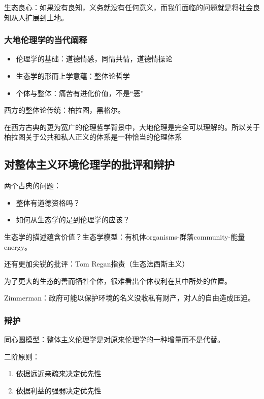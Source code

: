 \documentclass{ctexart}
\begin{document}
生态良心：如果没有良知，义务就没有任何意义，而我们面临的问题就是将社会良知从人扩展到土地。

\subsubsection{大地伦理学的当代阐释}

\begin{itemize}
    \item 伦理学的基础：道德情感，同情共情，道德情操论
    \item 生态学的形而上学意蕴：整体论哲学
    \item 个体与整体：痛苦有进化价值，不是“恶”
\end{itemize}

西方的整体论传统：柏拉图，黑格尔。

在西方古典的更为宽广的伦理哲学背景中，大地伦理是完全可以理解的。所以关于柏拉图关于公共和私人正义的体系是一种恰当的伦理体系

\subsection{对整体主义环境伦理学的批评和辩护}

两个古典的问题：

\begin{itemize}
    \item 整体有道德资格吗？
    \item 如何从生态学的是到伦理学的应该？
\end{itemize}

生态学的描述蕴含价值？生态学模型：有机体organisms-群落community-能量energy。

还有更加尖锐的批评：Tom Regan指责（生态法西斯主义）

为了更大的生态的善而牺牲个体，很难看出个体权利在其中所处的位置。

Zimmerman：政府可能以保护环境的名义没收私有财产，对人的自由造成压迫。

\subsubsection{辩护}

同心圆模型：整体主义伦理学是对原来伦理学的一种增量而不是代替。

二阶原则：

\begin{enumerate}
    \item 依据远近亲疏来决定优先性
    \item 依据利益的强弱决定优先性
\end{enumerate}
\end{document}
